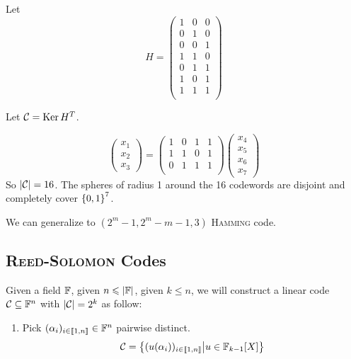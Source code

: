 \begin{example}
    Let
    \[
        H = \left(
            \begin{matrix}
                1 & 0 & 0\\
                0 & 1 & 0\\
                0 & 0 & 1\\
                1 & 1 & 0\\
                0 & 1 & 1\\
                1 & 0 & 1\\
                1 & 1 & 1\\
            \end{matrix}
        \right)
    \]
    
    Let $\mathcal{C} = \operatorname{Ker} H^T$.
    
    \[
        \left(
        \begin{matrix}
        x_1\\x_2\\x_3
        \end{matrix}
        \right) = \left( \begin{matrix}
        1&0&1&1\\
        1&1&0&1\\
        0&1&1&1\\
        \end{matrix} \right) \left( \begin{matrix}
        x_4\\x_5\\x_6\\x_7
        \end{matrix}\right)
    \]
    So $\left\lvert\mathcal{C}\right\rvert = 16$.
    The spheres of radius 1 around the 16 codewords are disjoint and completely cover $\left\{ 0,1 \right\}^7$.
\end{example}

We can generalize to $(2^m-1,2^m-m-1,3)$ \textsc{Hamming} code.

\subsection{\textsc{Reed-Solomon} Codes}

Given a field $\mathbb{F}$, given $n \leqslant \left\lvert\mathbb{F}\right\rvert$, given $k\leqslant n$, we will construct a linear code $\mathcal{C} \subseteq \mathbb{F}^n$ with $\left\lvert\mathcal{C}\right\rvert = 2^k$ as follow:
\begin{enumerate}[1)]
    \item Pick $(\alpha_i)_{i\in\left\llbracket 1,n \right\rrbracket} \in \mathbb{F}^n$ pairwise distinct.
        \[
            \mathcal{C} = \left\{ (u(\alpha_i))_{i\in\left\llbracket 1,n \right\rrbracket} \middle\vert u \in \mathbb{F}_{k-1}[X] \right\}
        \]
\end{enumerate}

